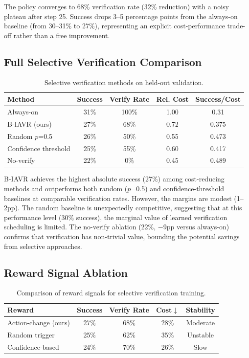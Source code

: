 \documentclass[11pt]{article}
\begin{document}
The policy converges to 68\% verification rate (32\% reduction) with a noisy plateau after step 25. Success drops 3--5 percentage points from the always-on baseline (from 30--31\% to 27\%), representing an explicit cost-performance trade-off rather than a free improvement.

\subsection{Full Selective Verification Comparison}

\begin{table}[h]
\centering
\caption{Selective verification methods on held-out validation.}
\label{tab:fullcomp}
\begin{tabular}{lcccc}
\toprule
Method & Success & Verify Rate & Rel. Cost & Success/Cost \\
\midrule
Always-on & 31\% & 100\% & 1.00 & 0.31 \\
B-IAVR (ours) & 27\% & 68\% & 0.72 & 0.375 \\
Random $p$=0.5 & 26\% & 50\% & 0.55 & 0.473 \\
Confidence threshold & 25\% & 55\% & 0.60 & 0.417 \\
No-verify & 22\% & 0\% & 0.45 & 0.489 \\
\bottomrule
\end{tabular}
\end{table}

B-IAVR achieves the highest absolute success (27\%) among cost-reducing methods and outperforms both random ($p$=0.5) and confidence-threshold baselines at comparable verification rates. However, the margins are modest (1--2pp). The random baseline is unexpectedly competitive, suggesting that at this performance level (30\% success), the marginal value of learned verification scheduling is limited. The no-verify ablation (22\%, $-$9pp versus always-on) confirms that verification has non-trivial value, bounding the potential savings from selective approaches.

\subsection{Reward Signal Ablation}

\begin{table}[h]
\centering
\caption{Comparison of reward signals for selective verification training.}
\label{tab:reward}
\begin{tabular}{lcccc}
\toprule
Reward & Success & Verify Rate & Cost$\downarrow$ & Stability \\
\midrule
Action-change (ours) & 27\% & 68\% & 28\% & Moderate \\
Random trigger & 25\% & 62\% & 35\% & Unstable \\
Confidence-based & 24\% & 70\% & 26\% & Slow \\
\bottomrule
\end{tabular}
\end{table}
\end{document}
